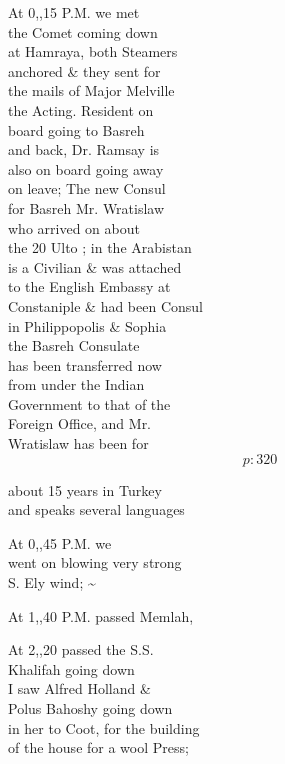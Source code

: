 \documentclass{report}
\begin{document}
	\par{
 	At 0,,15 P.M. we met\ \\the Comet coming down\ \\at Hamraya, both Steamers\ \\anchored \& they sent for\ \\the mails of Major Melville\ \\the Acting. Resident on\ \\board going to Basreh\ \\and back, Dr. Ramsay is\ \\also on board going away\ \\on leave; The new Consul\ \\for Basreh Mr. Wratislaw\ \\who arrived on about\ \\the 20 Ulto ; in the Arabistan\ \\is a Civilian \& was attached\ \\to the English Embassy at\ \\Constaniple \& had been Consul\ \\in Philippopolis \& Sophia\ \\the Basreh Consulate\ \\has been transferred now\ \\from under the Indian\ \\Government to that of the\ \\Foreign Office, and Mr.\ \\Wratislaw has been for\ \\
  \[p: 320 \]

	}



	\par{
 	about 15 years in Turkey\ \\and speaks several languages\ \\
	}

	\par{
 	At 0,,45 P.M. we\ \\went on blowing very strong\ \\S. Ely wind; \~{}\ \\
	}

	\par{
 	At 1,,40 P.M. passed Memlah,\ \\
	}

	\par{
 	At 2,,20 passed the S.S.\ \\Khalifah going down\ \\I saw Alfred Holland \&\ \\Polus Bahoshy going down\ \\in her to Coot, for the building\ \\of the house for a wool Press;\ \\
	}
\end{document}

